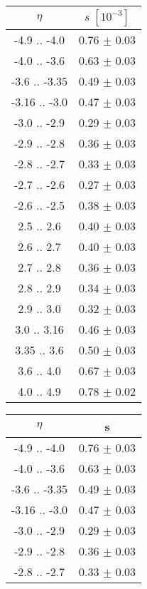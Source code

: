 \begin{table}[h]
    \centering
    \begin{tabular}{|c|c|}
        \hline
        $\eta$ & $s \; [10^{-3}]$ \\
        \hline \hline
        -4.9  .. -4.0  & 0.76 $\pm$ 0.03 \\
        -4.0  .. -3.6  & 0.63 $\pm$ 0.03 \\
        -3.6  .. -3.35 & 0.49 $\pm$ 0.03 \\
        -3.16 .. -3.0  & 0.47 $\pm$ 0.03 \\
        -3.0  .. -2.9  & 0.29 $\pm$ 0.03 \\
        -2.9  .. -2.8  & 0.36 $\pm$ 0.03 \\
        -2.8  .. -2.7  & 0.33 $\pm$ 0.03 \\
        -2.7  .. -2.6  & 0.27 $\pm$ 0.03 \\
        -2.6  .. -2.5  & 0.38 $\pm$ 0.03 \\
        \hline
         2.5  ..  2.6  & 0.40 $\pm$ 0.03 \\
         2.6  ..  2.7  & 0.40 $\pm$ 0.03 \\
         2.7  ..  2.8  & 0.36 $\pm$ 0.03 \\
         2.8  ..  2.9  & 0.34 $\pm$ 0.03 \\
         2.9  ..  3.0  & 0.32 $\pm$ 0.03 \\
         3.0  ..  3.16 & 0.46 $\pm$ 0.03 \\
         3.35 ..  3.6  & 0.50 $\pm$ 0.03 \\
         3.6  ..  4.0  & 0.67 $\pm$ 0.03 \\
         4.0  ..  4.9  & 0.78 $\pm$ 0.02 \\
         \hline
    \end{tabular}
    \hspace{10mm}
    \begin{tabular}{|c|c|}
        \hline
        $\eta$ & \textbf{s} \\
        \hline \hline
        -4.9  .. -4.0  & 0.76 $\pm$ 0.03 \\
        -4.0  .. -3.6  & 0.63 $\pm$ 0.03 \\
        -3.6  .. -3.35 & 0.49 $\pm$ 0.03 \\
        -3.16 .. -3.0  & 0.47 $\pm$ 0.03 \\
        -3.0  .. -2.9  & 0.29 $\pm$ 0.03 \\
        -2.9  .. -2.8  & 0.36 $\pm$ 0.03 \\
        -2.8  .. -2.7  & 0.33 $\pm$ 0.03 \\

\end{tabular}
\end{table}
